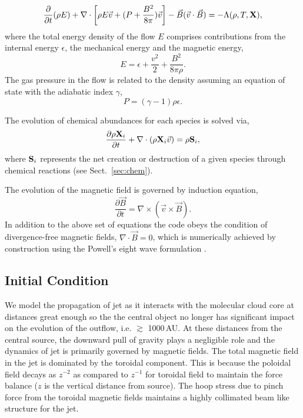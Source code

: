 \documentclass[useAMS,usenatbib,letters]{mn2e}
\begin{document}
\begin{equation}\label{encons1}
\frac{\partial}{\partial t}(\rho E)
+ \nabla \cdot\left[ \rho E \vec{v} + (P + \frac{B^2}{8\pi})\vec{v}\right]  
- \vec{B}(\vec{v}\cdot\vec{B}) = -\Lambda(\rho,T,{\bf{X}}),
\end{equation}
%
%
where the total energy density of the flow $E$ comprises contributions from 
the internal energy $\epsilon$, the mechanical energy and the magnetic energy,
%
\begin{equation}\label{encons2}
 E = \epsilon + \frac{v^2}{2} + \frac{B^2}{8 \pi \rho}.
\end{equation}
The gas pressure in the flow is related to the density assuming an equation 
of state with the adiabatic index $\gamma$,
%
\begin{equation}\label{EOS}
P = (\gamma - 1) \rho \epsilon.
\end{equation}

The evolution of chemical abundances for each species is solved via,
%
\begin{equation}\label{chemevol}
\frac{\partial \rho{\bf{X}}_{i}}{\partial t} + \nabla \cdot (\rho
{\bf{X}}_{i} \vec{v})  = \rho {\bf{S}}_{i},
\end{equation}
where ${\bf{S}}_{i}$ represents the net creation or destruction of a
given species through chemical reactions (see Sect.~\ref{sec:chem}).

The evolution of the magnetic field is governed by induction equation,
%
\begin{equation}\label{induction}
\frac{\partial \vec{B}}{\partial t} = \nabla \times \left(\vec{v}\times \vec{B}\right).
\end{equation}
%
In addition to the above set of equations the code obeys the condition of divergence-free 
magnetic fields, $\nabla \cdot \vec{B} = 0$, which is numerically achieved by construction 
using the Powell's eight wave formulation \citep{Powell:1999p14822}.

\subsection{Initial Condition}
We model the propagation of jet as it interacts with the molecular
cloud core at distances great enough so the the central object no longer has significant impact on the evolution of the outflow, i.e. $\gtrsim$ 1000\,AU. 
At these distances from the central source, the downward pull of gravity plays a
negligible role and the dynamics of jet is primarily governed by magnetic fields.
The total magnetic field in the jet is dominated by the toroidal
component. This is because the poloidal field decays as $z^{-2}$ as
compared to $z^{-1}$ for toroidal field to maintain the force balance ($z$ is the vertical distance from source). 
The hoop stress due to pinch force from the toroidal magnetic fields maintains
a highly collimated beam like structure for the jet.
%
\end{document}
